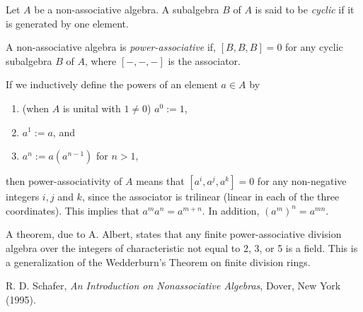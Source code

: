 \documentclass[12pt]{article}
\begin{document}
Let $A$ be a non-associative algebra.  A subalgebra $B$ of $A$ is said to be \emph{cyclic} if it is generated by one element.

A non-associative algebra is \emph{power-associative} if, $[B,B,B]=0$ for any cyclic subalgebra $B$ of $A$, where $[-,-,-]$ is the associator.  

If we inductively define the powers of an element $a\in A$ by
\begin{enumerate}
\item (when $A$ is unital with $1\neq0$) $a^0:=1$,
\item $a^1:=a$, and 
\item $a^n:=a(a^{n-1})$ for $n>1$,
\end{enumerate}
then power-associativity of $A$ means that $[a^i,a^j,a^k]=0$ for any non-negative integers $i,j$ and $k$, since the associator is trilinear (linear in each of the three coordinates).  This implies that $a^ma^n=a^{m+n}$.  In addition, $(a^m)^n=a^{mn}$.

A theorem, due to A. Albert, states that any finite power-associative division algebra over the integers of characteristic not equal to 2, 3, or 5 is a field.  This is a generalization of the Wedderburn's Theorem on finite division rings.

\begin{thebibliography}{8}
 R. D. Schafer, {\em An Introduction on Nonassociative Algebras}, Dover, New York (1995).
\end{thebibliography}
\end{document}
